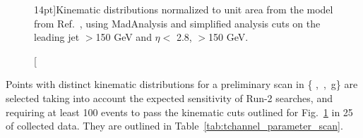 \begin{figure}
	\centering
	\hfill
	\caption[][14pt]{Kinematic distributions normalized to unit area from the \tchannel model from Ref.~\cite{Bell:2012rg}, using MadAnalysis \cite{} and simplified
		analysis cuts on the leading jet \pT$>$150 GeV and $\eta <$ 2.8, \MET{}$>$150 GeV.}
	\label{fig:monojet_tchannel}
\end{figure}

Points with distinct kinematic distributions for a preliminary scan in \{ \mDM,\, \Mphi,\, g\} are selected 
taking into account the expected sensitivity of Run-2 searches, and requiring at least 100 events
to pass the kinematic cuts outlined for Fig.~\ref{fig:monojet_tchannel} in 25 \invfb of collected data.
They are outlined in Table~\ref{tab:tchannel_parameter_scan}. 


